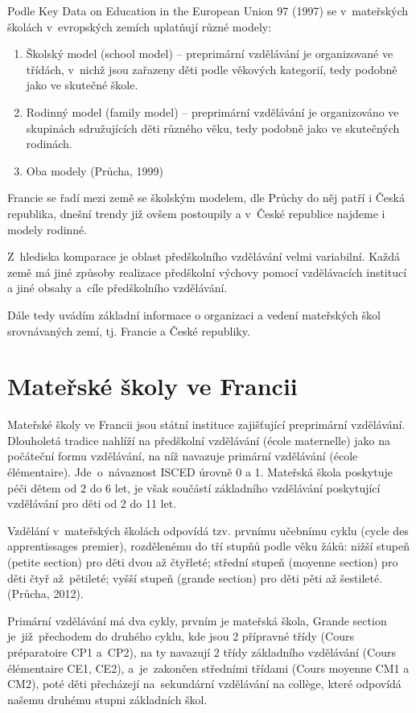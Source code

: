 		Podle Key Data on Education in the European Union 97 (1997) se v mateřských školách v evropských zemích uplatňují různé modely:
		\begin{enumerate}[1)]
		\item Školský model (school model) – preprimární vzdělávání je organizované ve třídách, v nichž jsou zařazeny děti podle věkových kategorií, tedy podobně jako ve skutečné škole. 
		\item Rodinný model (family model) – preprimární vzdělávání je organizováno ve skupinách sdružujících děti různého věku, tedy podobně jako ve skutečných rodinách. 
		\item Oba modely
		(Průcha, 1999)
		\end{enumerate}

		Francie se řadí mezi země se školským modelem, dle Průchy do něj patří i Česká republika, dnešní trendy již ovšem postoupily a v České republice najdeme i modely rodinné.

		Z hlediska komparace je oblast předškolního vzdělávání velmi variabilní. Každá země má jiné způsoby realizace předškolní výchovy pomocí vzdělávacích institucí a jiné obsahy a cíle předškolního vzdělávání. 

		Dále tedy uvádím základní informace o organizaci a vedení mateřských škol srovnávaných zemí, tj. Francie a České republiky.

	\section{Mateřské školy ve Francii}
		Mateřské školy ve Francii jsou státní instituce zajišťující preprimární vzdělávání. Dlouholetá tradice nahlíží na předškolní vzdělávání (école maternelle) jako na počáteční formu vzdělávání, na níž navazuje primární vzdělávání (école élémentaire). Jde o návaznost ISCED  úrovně 0 a 1. Mateřská škola poskytuje péči dětem od 2 do 6 let, je však součástí základního vzdělávání poskytující vzdělávání pro děti od 2 do 11 let.

		Vzdělání v mateřských školách odpovídá tzv. prvnímu učebnímu cyklu (cycle des apprentissages premier), rozdělenému do tří stupňů podle věku žáků: nižší stupeň (petite section) pro děti dvou až čtyřleté; střední stupeň (moyenne section) pro děti čtyř až pětileté; vyšší stupeň (grande section) pro děti pěti až šestileté.
		(Průcha, 2012). 

		Primární vzdělávání má dva cykly, prvním je mateřská škola, Grande section je již přechodem do druhého cyklu, kde jsou 2 přípravné třídy (Cours préparatoire CP1 a CP2), na ty navazují 2 třídy základního vzdělávání (Cours élémentaire CE1, CE2), a je zakončen středními třídami (Cours moyenne CM1 a CM2), poté děti přecházejí na sekundární vzdělávání na collège, které odpovídá našemu druhému stupni základních škol. 

